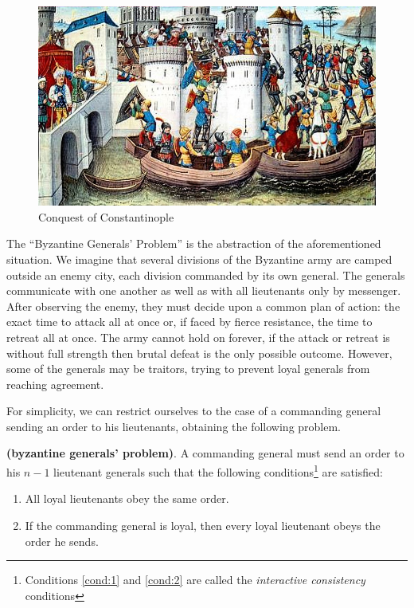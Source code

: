 \bigskip
\begin{figure}[h]
    \centering
	\includegraphics[width=0.9\linewidth]{Images/byzantine.jpeg}
	\caption{Conquest of Constantinople}
	\label{fig:figure4}
\end{figure}

\bigskip
\noindent
The \enquote{Byzantine Generals' Problem} is the abstraction of the aforementioned situation.
We imagine that several divisions of the Byzantine army are camped outside an enemy city, each division commanded by its own general. The generals communicate with one another as well as with all lieutenants only by messenger. After observing the enemy, they must decide upon a common plan of action: the exact time to attack all at once or, if faced by fierce resistance, the time to retreat all at once. The army cannot hold on forever, if the attack or retreat is without full strength then brutal defeat is the only possible outcome. However, some of the generals may be traitors, trying to prevent loyal generals from reaching agreement. 

\bigskip
\noindent
For simplicity, we can restrict ourselves to the case of a commanding general sending an order to his lieutenants, obtaining the following problem.
\begin{mydef}{\bf (byzantine generals' problem)}.
\label{def:bgp}
    A commanding general must send an order to his $n-1$ lieutenant generals such that the following conditions\footnote{Conditions \ref{cond:1} and \ref{cond:2} are called the \textit{interactive consistency} conditions} are satisfied:
    \begin{enumerate}
        \item \label{cond:1} All loyal lieutenants obey the same order.
        \item \label{cond:2} If the commanding general is loyal, then every loyal lieutenant obeys the order he sends.
    \end{enumerate}
\end{mydef}

